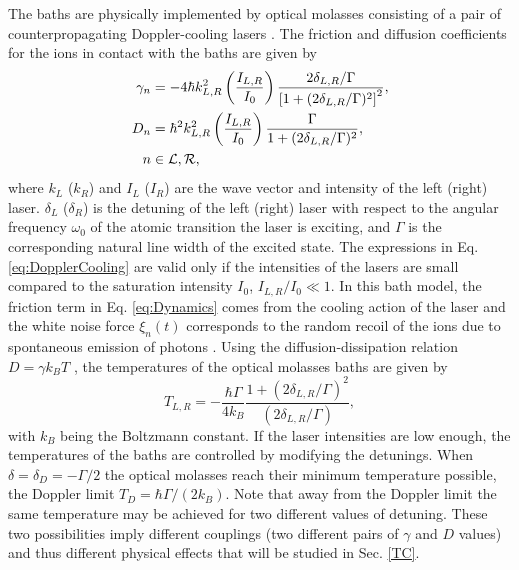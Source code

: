 The baths are physically implemented by optical molasses consisting of a pair of counterpropagating Doppler-cooling lasers \cite{Ruiz2014}. The friction and diffusion coefficients for the ions in contact with the baths are given by \cite{Cohen1992,Metcalf2003,Ruiz2014}
%
\begin{equation}
    \begin{split}
        \gamma_n &= -4 \hbar k_{L,R}^2 \left(\frac{I_{L,R}}{I_0}\right)\frac{2\delta_{L,R}/\Gamma}{\left[1 + (2\delta_{L,R}/\Gamma)^2\right]^2},\\
        D_n &= \hbar^2 k_{L,R}^2 \left(\frac{I_{L,R}}{I_0}\right) \frac{\Gamma}{1 + (2\delta_{L,R}/\Gamma)^2},\\
        n &\in \cal{L},\cal{R},
    \end{split}
    \label{eq:DopplerCooling}
\end{equation}
%
where $k_L$ ($k_R$) and $I_L$ ($I_R$) are the wave vector and intensity of the left (right) laser. $\delta_L$ ($\delta_R$) is the detuning of the left (right) laser with respect to the angular frequency $\omega_0$ of the atomic transition the laser is exciting, and $\Gamma$ is the corresponding natural line width of the  excited state. The expressions in Eq. \eqref{eq:DopplerCooling} are valid only if the intensities of the lasers are small compared to the saturation intensity $I_0$, $I_{L,R}/I_0\ll 1$. In this bath model, the friction term in Eq. \eqref{eq:Dynamics} comes from the cooling action of the laser and the white noise force $\xi_n(t)$ corresponds to the random recoil of the ions due to spontaneous emission of photons \cite{Metcalf2003,Cohen1992}. Using the diffusion-dissipation relation $D = \gamma k_B T $ \cite{Chee2010}, the temperatures of the optical molasses baths are given by
%
\begin{equation}
    T_{L,R} = -\frac{\hbar \Gamma}{4 k_B} \frac{1+(2\delta_{L,R}/\Gamma)^2}{(2\delta_{L,R}/\Gamma)},
    \label{eq:Doppler}
\end{equation}
%
with $k_B$ being the Boltzmann constant. If the laser intensities are low enough, the temperatures of the baths are controlled by modifying the detunings. When $\delta = \delta_D=-\Gamma / 2$ the optical molasses reach their minimum temperature possible, the Doppler limit $T_{D} = {\hbar \Gamma}/({2k_B})$. Note that away from the Doppler limit the same temperature may be achieved
for two different values of detuning. These two possibilities imply different couplings (two different pairs of $\gamma$ and $D$ values) and thus different physical effects that will be studied in Sec. \ref{TC}.
%
%
%
%
